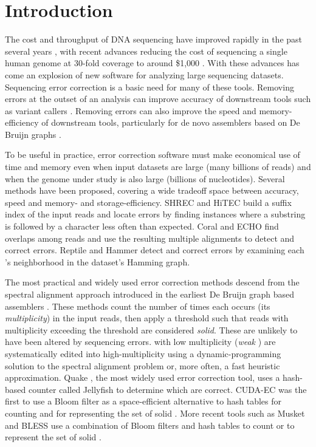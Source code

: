 \documentclass{bmcart}
\begin{document}
\section*{Introduction}
The cost and throughput of DNA sequencing have improved rapidly in the past several years \cite{glenn2011field}, with recent advances reducing the cost of sequencing a single human genome at 30-fold coverage to around \$1,000 \cite{1kgenomeforreal}.
With these advances has come an explosion of new software for analyzing large sequencing datasets.
Sequencing error correction is a basic need for many of these tools.
Removing errors at the outset of an analysis can improve accuracy of downstream tools such as variant callers \cite{kelley2010quake}.
Removing errors can also improve the speed and memory-efficiency of downstream tools, particularly for de novo assemblers based on De Bruijn graphs  \cite{pevzner2001eulerian, chaisson2004fragment}.

To be useful in practice, error correction software must make economical use of time and memory even when input datasets are large (many billions of reads) and when the genome under study is also large (billions of nucleotides).
Several methods have been proposed, covering a wide tradeoff space between accuracy, speed and memory- and storage-efficiency.
SHREC \cite{schroder2009shrec} and HiTEC \cite{ilie2011hitec} build a suffix index of the input reads and locate errors by finding instances where a substring is followed by a character less often than expected.
Coral \cite{salmela2011correcting} and ECHO \cite{kao2011echo} find overlaps among reads and use the resulting multiple alignments to detect and correct errors.
Reptile \cite{yang2010reptile} and Hammer \cite{medvedev2011error} detect and correct errors by examining each \kmer's neighborhood in the dataset's \kmer Hamming graph.

The most practical and widely used error correction methods descend from the spectral alignment approach introduced in the earliest De Bruijn graph based assemblers \cite{pevzner2001eulerian, chaisson2004fragment}.
These methods count the number of times each \kmer occurs (its \emph{multiplicity}) in the input reads, then apply a threshold such that reads with multiplicity exceeding the threshold are considered \emph{solid}.
These \kmers are unlikely to have been altered by sequencing errors.
\kmers with low multiplicity (\emph{weak} \kmers) are systematically edited into high-multiplicity \kmers using a dynamic-programming solution to the spectral alignment problem \cite{pevzner2001eulerian, chaisson2004fragment} or, more often, a fast heuristic approximation.
Quake \cite{kelley2010quake}, the most widely used error correction tool, uses a hash-based \kmer counter called Jellyfish \cite{marccais2011fast} to determine which \kmers are correct.
CUDA-EC \cite{shi2010parallel} was the first to use a Bloom filter as a space-efficient alternative to hash tables for counting \kmers and for representing the set of solid \kmers.
More recent tools such as Musket \cite{liu2013musket} and BLESS \cite{heo2014bless} use a combination of Bloom filters and hash tables to count \kmers or to represent the set of solid \kmers.
\end{document}
